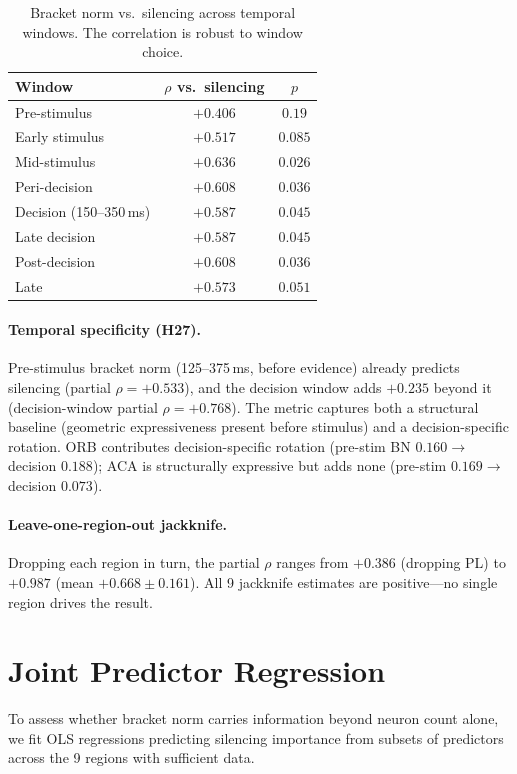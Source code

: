 \documentclass[9pt,lineno]{elife}
\begin{document}
\begin{table}[h]
\centering
\caption{Bracket norm vs.\ silencing across temporal windows. The correlation is robust to window choice.}
\label{tab:windows}
\small
\begin{tabular}{lcc}
\toprule
Window & $\rho$ vs.\ silencing & $p$ \\
\midrule
Pre-stimulus & $+0.406$ & $0.19$ \\
Early stimulus & $+0.517$ & $0.085$ \\
Mid-stimulus & $+0.636$ & $0.026$ \\
Peri-decision & $+0.608$ & $0.036$ \\
Decision (150--350\,ms) & $+0.587$ & $0.045$ \\
Late decision & $+0.587$ & $0.045$ \\
Post-decision & $+0.608$ & $0.036$ \\
Late & $+0.573$ & $0.051$ \\
\bottomrule
\end{tabular}
\end{table}

\paragraph{Temporal specificity (H27).} Pre-stimulus bracket norm (125--375\,ms, before evidence) already predicts silencing (partial $\rho = +0.533$), and the decision window adds $+0.235$ beyond it (decision-window partial $\rho = +0.768$). The metric captures both a structural baseline (geometric expressiveness present before stimulus) and a decision-specific rotation. ORB contributes decision-specific rotation (pre-stim BN $0.160 \to$ decision $0.188$); ACA is structurally expressive but adds none (pre-stim $0.169 \to$ decision $0.073$).

\paragraph{Leave-one-region-out jackknife.} Dropping each region in turn, the partial $\rho$ ranges from $+0.386$ (dropping PL) to $+0.987$ (mean $+0.668 \pm 0.161$). All 9 jackknife estimates are positive---no single region drives the result.

\section{Joint Predictor Regression}
\label{app:joint}

To assess whether bracket norm carries information beyond neuron count alone, we fit OLS regressions predicting silencing importance from subsets of predictors across the 9 regions with sufficient data.
\end{document}
